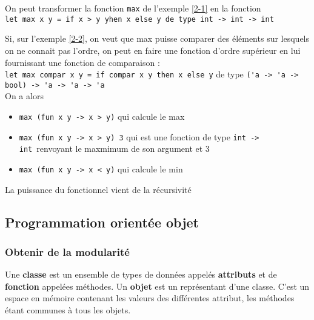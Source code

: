 \begin{example}
	On peut transformer la fonction \lstinline|max| de l'exemple \ref{2-1} en la fonction \\ \lstinline|let max x y = if x > y yhen x else y de type int -> int -> int| \label{2-2}
\end{example}

\begin{example}
	Si, sur l'exemple \ref{2-2}, on veut que max puisse comparer des éléments sur lesquels on ne connait pas l'ordre, on peut en faire une fonction d'ordre supérieur en lui fournissant une fonction de comparaison : \\
	\lstinline|let max compar x y = if compar x y then x else y| de type \lstinline|('a -> 'a -> bool) -> 'a -> 'a -> 'a|\\
	On a alors \begin{itemize}[label =]
		\item \lstinline|max (fun x y -> x > y)| qui calcule le max 
		\item \lstinline|max (fun x y -> x > y) 3| qui est une fonction de type \lstinline|int -> int| renvoyant le maxmimum de son argument et 3
		\item \lstinline|max (fun x y -> x < y)| qui calcule le min
	\end{itemize}
\end{example}

\begin{rem}
	La puissance du fonctionnel vient de la récursivité
\end{rem}

\subsection{Programmation orientée objet}

\subsubsection{Obtenir de la modularité}

\begin{definition}
	Une \textbf{classe} est un ensemble de types de données appelés \textbf{attributs} et de \textbf{fonction} appelées méthodes. \newline
	Un \textbf{objet} est un représentant d'une classe. C'est un espace en mémoire contenant les valeurs des différentes attribut, les méthodes étant communes à tous les objets.
\end{definition}

